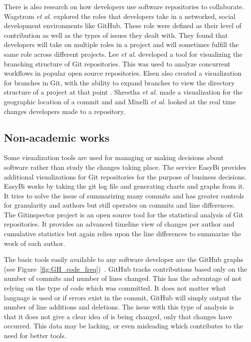 There is also research on how developers use software repositories to collaborate. Wagstrom \textit{et al.} \cite{Patrick:Wagstrom:2012} explored the roles that developers take in a networked, social development environments like GitHub. These role were defined as their level of contribution as well as the types of issues they dealt with. They found that developers will take on multiple roles in a project and will sometimes fulfill the same role across different projects. Lee \textit{et al.} \cite{lee2013} developed a tool for visualizing the branching structure of Git repositories. This was used to analyze concurrent workflows in popular open source repositories. Elsen also created a visualization for branches in Git, with the ability to expand branches to view the directory structure of a project at that point \cite{6650522}.   Shrestha \textit{et al.} made a visualization for the geographic location of a commit and \cite{6650532} and Minelli \textit{et al.} \cite{6980226} looked at the real time changes developers made to a repository.

\subsection{Non-academic works}

Some visualization tools are used for managing or making decisions about software rather than study the changes taking place. The service EasyBi \cite{EasyBi} provides additional visualizations for Git repositories for the purpose of business decisions. EasyBi works by taking the git log file and generating charts and graphs from it. It tries to solve the issue of summarizing many commits and has greater controls for granularity and authors but still operates on commits and line differences. The Gitinspector project \cite{Gitinspector} is an open source tool for the statistical analysis of Git repositories. It provides an advanced timeline view of changes per author and cumulative statistics but again relies upon the line differences to summarize the work of each author.

The basic tools easily available to any software developer are the GitHub graphs (see Figure~\ref{fig:GH_code_freq})~\cite{github-graphs}. GitHub tracks contributions based only on the number of commits and number of lines changed. This has the advantage of not relying on the type of code which was committed. It does not matter what language is used or if errors exist in the commit, GitHub will simply output the number of line additions and deletions. The issue with this type of analysis is that it does not give a clear idea of is being changed, only that changes have occurred. This data may be lacking, or even misleading which contributes to the need for better tools.  


